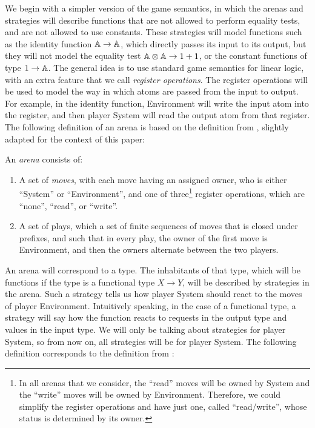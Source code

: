 We begin with a simpler version of the game semantics, in which the arenas and strategies will describe functions that are not allowed to perform equality tests, and are not allowed to use constants. These strategies will model functions such as the identity function $\mathbb A \to \mathbb A$, which directly passes its input to its output, but they  will not model the equality test $\mathbb A \otimes \mathbb A \to 1 + 1$, or the constant functions of type $1 \to \mathbb A$. The general idea is to use standard game semantics for linear logic, with an extra feature that we call \emph{register operations}. The register operations will be used to model the way in which atoms are passed from the input to output. For example, in the identity function,  Environment will  write the input atom into the register, and then player System will read the output atom from that register. The following definition of an arena is based on the definition from \cite[p.4]{abramsky2013semantics}, slightly
adapted for the context of this paper:
\begin{definition}[Arena] \label{def:arena}
    An \emph{arena} consists of:
    \begin{enumerate}
        \item A set of \emph{moves}, with each move having an assigned owner, who is either ``System'' or ``Environment'', and one of three\footnote{\label{footnote:read-write} In all arenas that we consider, the ``read'' moves will be owned by System and the ``write'' moves will be owned by Environment. Therefore, we could simplify the register operations and have just one, called ``read/write'', whose status is determined by its owner. 
        } register operations, which are ``none'', ``read'', or ``write''.
                \item A set of plays, which a set of finite sequences of moves that is closed under prefixes, and such that in every play, the owner of the first move is Environment, and then the owners alternate between the two players.
    \end{enumerate}
\end{definition}




An arena will correspond to a type. The inhabitants of that type, which will be  functions if the type is a functional type $X \to Y$, will be described by strategies in the arena. Such a strategy tells us how player System should react to the moves of player Environment. Intuitively speaking, in the case of a functional type, a strategy will say how the function reacts to requests in the output type and values in the input type. We will only be talking about strategies for player System, so from now on, all strategies will be for player System. The following definition corresponds to the definition from \cite[p.5]{abramsky2013semantics}:


